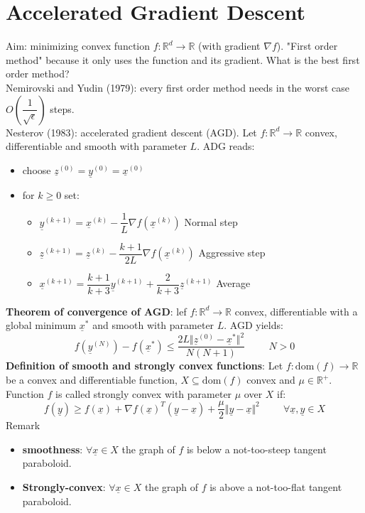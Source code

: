 \section{Accelerated Gradient Descent}
Aim: minimizing convex function $f: \mathbb{R}^d \to \mathbb{R}$ (with gradient $\nabla f$). "First order method" because it only uses the function and its gradient. What is the best first order method?\\
Nemirovski and Yudin (1979): every first order method needs in the worst case $O\left(\dfrac{1}{\sqrt{\epsilon}}\right)$ steps. \\
Nesterov (1983): accelerated gradient descent (AGD). Let $f: \mathbb{R}^d \to \mathbb{R}$ convex, differentiable and smooth with parameter $L$. ADG reads:
\begin{itemize}
    \item choose $\underline{z}^{(0)} = \underline{y}^{(0)} = \underline{x}^{(0)}$
    \item for $k \geq 0$ set:
    \begin{itemize}
        \item $\underline{y}^{(k+1)} = \underline{x}^{(k)} - \dfrac{1}{L} \nabla f(\underline{x}^{(k)})$ \hspace{2cm} Normal step
        \item $\underline{z}^{(k+1)} = \underline{z}^{(k)} - \dfrac{k+1}{2L} \nabla f (\underline{x}^{(k)})$ \hspace{2cm} Aggressive step
        \item $\underline{x}^{(k+1)} = \dfrac{k+1}{k+3} \underline{y}^{(k+1)} + \dfrac{2}{k+3} \underline{z}^{(k+1)}$ \hspace{2cm} Average 
    \end{itemize}
\end{itemize}

\textbf{Theorem of convergence of AGD}: lef $f: \mathbb{R}^d \to \mathbb{R}$ convex, differentiable with a global minimum $\underline{x}^*$ and smooth with parameter $L$. AGD yields:
\[
f(\underline{y}^{(N)}) - f(\underline{x}^*) \leq \dfrac{2L \Vert \underline{z}^{(0)} - \underline{x}^* \Vert^2}{N(N+1)}  \hspace{1cm} N > 0   
\]
\textbf{Definition of smooth and strongly convex functions}: Let $f: \text{dom}(f) \to \mathbb{R}$ be a convex and differentiable function, $X \subseteq \text{dom}(f)$ convex and $\mu \in \mathbb{R}^+$. Function $f$ is called strongly convex with parameter $\mu$ over $X$ if:
\[
f(\underline{y}) \geq f(\underline{x}) + \nabla f(\underline{x})^T (\underline{y} - \underline{x}) + \dfrac{\mu}{2} \Vert \underline{y} - \underline{x} \Vert^2 \hspace{1cm} \forall \underline{x}, \underline{y} \in X    
\] 
Remark
\begin{itemize}
    \item \textbf{smoothness}: $\forall \underline{x} \in X$ the graph of $f$ is below a not-too-steep tangent paraboloid.
    \item \textbf{Strongly-convex}: $\forall \underline{x} \in X$ the graph of $f$ is above a not-too-flat tangent paraboloid.\\ 
\end{itemize}

